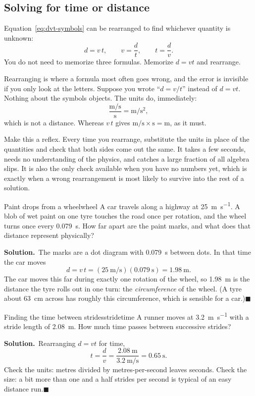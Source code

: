 \documentclass[11pt,twoside,openany]{book}
\newcounter{check}[chapter]
\newcommand{\solution}{\par\smallskip\noindent\textbf{Solution.}\ }
\newcommand{\qed}{\hfill$\blacksquare$}
\begin{document}
\subsection{Solving for time or distance}

Equation~\eqref{eq:dvt-symbols} can be rearranged to find whichever quantity is unknown:
\[
d = v\,t, \qquad v = \frac{d}{t}, \qquad t = \frac{d}{v}.
\]
You do not need to memorize three formulas. Memorize $d = vt$ and rearrange.

\begin{modelnote}
Rearranging is where a formula most often goes wrong, and the error is invisible if you only look at the letters. Suppose you wrote ``$d = v/t$'' instead of $d = vt$. Nothing about the symbols objects. The units do, immediately:
\[
\frac{\si{\metre\per\second}}{\si{\second}} = \si{\metre\per\second\squared},
\]
which is not a distance. Whereas $v\,t$ gives $\si{\metre\per\second}\times\si{\second} = \si{\metre}$, as it must.

Make this a reflex. Every time you rearrange, substitute the units in place of the quantities and check that both sides come out the same. It takes a few seconds, needs no understanding of the physics, and catches a large fraction of all algebra slips. It is also the only check available when you have no numbers yet, which is exactly when a wrong rearrangement is most likely to survive into the rest of a solution.
\end{modelnote}

\begin{example}{Paint drops from a wheel}{wheel}
A car travels along a highway at \SI{25}{\metre\per\second}. A blob of wet paint on one tyre touches the road once per rotation, and the wheel turns once every \SI{0.079}{\second}. How far apart are the paint marks, and what does that distance represent physically?

\solution The marks are a dot diagram with \SI{0.079}{\second} between dots. In that time the car moves
\[
d = v\,t = (\SI{25}{\metre\per\second})(\SI{0.079}{\second}) = \SI{1.98}{\metre}.
\]
The car moves this far during exactly one rotation of the wheel, so \SI{1.98}{\metre} is the distance the tyre rolls out in one turn: the \emph{circumference} of the wheel. (A tyre about \SI{63}{\centi\metre} across has roughly this circumference, which is sensible for a car.)\qed
\end{example}

\begin{example}{Finding the time between strides}{stridetime}
A runner moves at \SI{3.2}{\metre\per\second} with a stride length of \SI{2.08}{\metre}. How much time passes between successive strides?

\solution Rearranging $d = vt$ for time,
\[
t = \frac{d}{v} = \frac{\SI{2.08}{\metre}}{\SI{3.2}{\metre\per\second}} = \SI{0.65}{\second}.
\]
Check the units: metres divided by metres-per-second leaves seconds. Check the size: a bit more than one and a half strides per second is typical of an easy distance run.\qed
\end{example}
\end{document}
